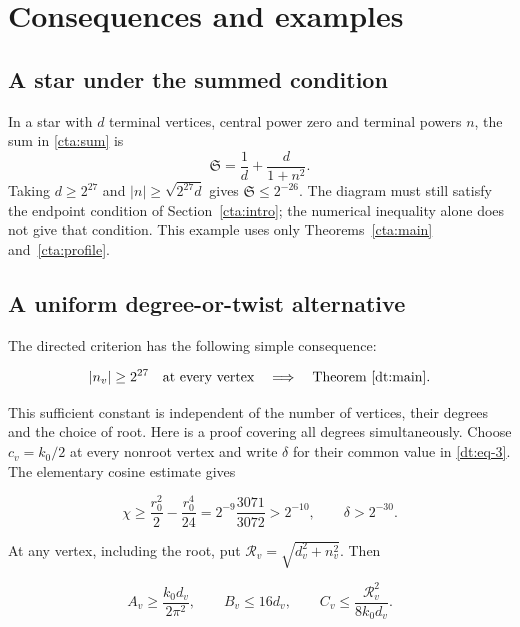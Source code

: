 \section{Consequences and examples}\label{dt:sec-8}


\subsection{A star under the summed condition}
In a star with \(d\) terminal vertices, central power zero and terminal
powers \(n\), the sum in \eqref{cta:sum} is
\[
 \mathfrak S=\frac1d+\frac{d}{1+n^2}.
\]
Taking \(d\ge2^{27}\) and \(|n|\ge\sqrt{2^{27}d}\) gives
\(\mathfrak S\le2^{-26}\). The diagram must still satisfy the endpoint
condition of Section~\ref{cta:intro}; the numerical inequality alone
does not give that condition. This example uses only
Theorems~\ref{cta:main} and~\ref{cta:profile}.

\subsection{A uniform degree-or-twist alternative}

The directed criterion has the following simple consequence:

\begin{equation}\label{dt:eq-47}
|n_v|\ge2^{27}\quad\text{at every vertex}
             \quad\Longrightarrow\quad\text{Theorem~\ref{dt:main}}.
\end{equation}

This sufficient constant is independent of the number of vertices,
their degrees and the choice of root. Here is a proof covering all
degrees simultaneously. Choose \(c_v=k_0/2\) at every nonroot vertex
and write \(\delta\) for their common value in \eqref{dt:eq-3}. The elementary
cosine estimate gives

\begin{equation}\label{dt:eq-48}
\chi\ge\frac{r_0^2}{2}-\frac{r_0^4}{24}
       =2^{-9}\frac{3071}{3072}>2^{-10},\qquad
                          \delta>2^{-30}.
\end{equation}

At any vertex, including the root, put
\(\mathcal R_v=\sqrt{d_v^2+n_v^2}\). Then

\begin{equation}\label{dt:eq-49}
A_v\ge\frac{k_0d_v}{2\pi^2},\qquad B_v\le16d_v,
 \qquad C_v\le\frac{\mathcal R_v^2}{8k_0d_v}.
\end{equation}

